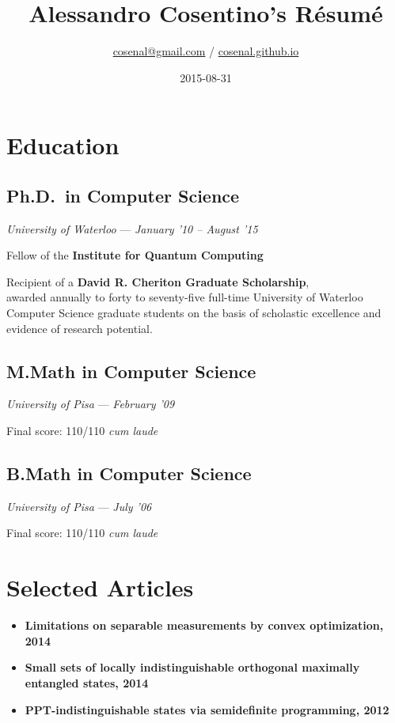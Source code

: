 \documentclass[]{article}
\title{Alessandro Cosentino's Résumé}
\author{\href{mailto:cosenal@gmail.com}{cosenal@gmail.com} / 
  \href{https://cosenal.github.io}{cosenal.github.io}}
\date{2015-08-31}
\begin{document}
\maketitle

\section{Education}\label{education}

\subsection{Ph.D.~in Computer Science}\label{ph.d.in-computer-science}

\emph{University of Waterloo} --- \emph{January '10 -- August '15}

Fellow of the \textbf{Institute for Quantum Computing}

Recipient of a \textbf{David R. Cheriton Graduate Scholarship},\\awarded
annually to forty to seventy-five full-time University of Waterloo
Computer Science graduate students on the basis of scholastic excellence
and evidence of research potential.

\subsection{M.Math in Computer
Science}\label{m.math-in-computer-science}

\emph{University of Pisa} --- \emph{February '09}

Final score: 110/110 \emph{cum laude}

\subsection{B.Math in Computer
Science}\label{b.math-in-computer-science}

\emph{University of Pisa} --- \emph{July '06}

Final score: 110/110 \emph{cum laude}

\section{Selected Articles}\label{selected-articles}

\begin{itemize}
\itemsep1pt\parskip0pt
\item
  \textbf{Limitations on separable measurements by convex optimization,
  2014}
\item
  \textbf{Small sets of locally indistinguishable orthogonal maximally
  entangled states, 2014}
\item
  \textbf{PPT-indistinguishable states via semidefinite programming,
  2012}
\end{itemize}
\end{document}
